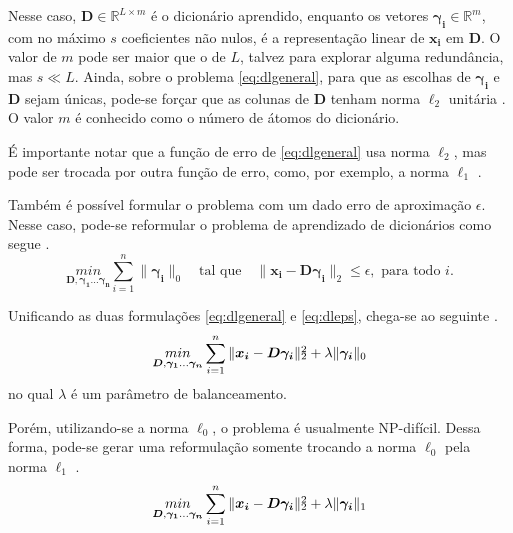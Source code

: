 \documentclass[cic,tc]{iiufrgs}
\def\SPSB#1#2{\rlap{\textsuperscript{#1}}\SB{#2}}
\def\SB#1{\textsubscript{#1}}
\renewcommand{\vec}[1]{\bm{#1}}
\newcommand{\mat}[1]{\bm{#1}}
\begin{document}
Nesse caso, $\mat{D} \in \mathbb{R}^{L\times m}$ é o dicionário aprendido, enquanto os 
vetores $\vec{\gamma_i} \in \mathbb{R}^m$, com no máximo $s$ coeficientes não nulos, é a representação
linear de $\vec{x_i}$ em $\mat{D}$. O valor de $m$ pode ser maior que o de $L$, talvez para 
explorar alguma redundância, mas $s\ll L$. Ainda, sobre o problema \eqref{eq:dlgeneral}, para que as escolhas
de $\vec{\gamma_i}$ e $\mat{D}$ sejam únicas, pode-se forçar que as colunas de $\mat{D}$ tenham norma $\ell_2$
unitária \cite{chen2015compressed}. O valor $m$ é conhecido como o número de átomos do 
dicionário.

É importante notar que a função de erro de \eqref{eq:dlgeneral} usa norma $\ell_2$, mas pode ser trocada
por outra função de erro, como, por exemplo, a norma $\ell_1$ \cite{chen2015compressed}.

Também é possível formular o problema com um dado erro de aproximação $\epsilon$.
Nesse caso, pode-se reformular o problema de aprendizado de dicionários como segue \cite{chen2015compressed}.
\begin{equation}
    \label{eq:dleps}
    \underset{\mat{D}, \vec{\gamma_1}...\vec{\gamma_n}}{min} 
    \sum_{i=1}^{n} {\lVert \vec{\gamma_i} \rVert_0}
    \hspace{1em} \text{tal que} \hspace{1em}
    \lVert \vec{x_i} - \mat{D}\vec{\gamma_i} \rVert_2 \le \epsilon, \text{ para todo } i.
\end{equation}

Unificando as duas formulações \eqref{eq:dlgeneral} e \eqref{eq:dleps}, chega-se ao seguinte
\cite{chen2015compressed}.
\begin{equation}
    \label{eq:dlunica}
    \underset{\mat{D}, \vec{\gamma_1}...\vec{\gamma_n}}{min} 
    \sum_{i=1}^{n} {\lVert \vec{x_i} - \mat{D}\vec{\gamma_i} \rVert\SPSB{2}{2} + \lambda \lVert \vec{\gamma_i} \rVert_0}
\end{equation}
no qual $\lambda$ é um parâmetro de balanceamento.

Porém, utilizando-se a norma $\ell_0$, o problema é usualmente NP-difícil. Dessa forma, pode-se gerar
uma reformulação somente trocando a norma $\ell_0$ pela norma $\ell_1$ \cite{chen2015compressed}.
\begin{equation}
    \label{eq:dlunical1}
    \underset{\mat{D}, \vec{\gamma_1}...\vec{\gamma_n}}{min} 
    \sum_{i=1}^{n} {\lVert \vec{x_i} - \mat{D}\vec{\gamma_i} \rVert\SPSB{2}{2} + \lambda \lVert \vec{\gamma_i} \rVert_1}
\end{equation}
\end{document}
